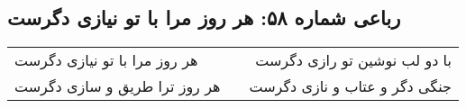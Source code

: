 \begin{center}
\section*{رباعی شماره ۵۸: هر روز مرا با تو نیازی دگرست}
\label{sec:sh058}
\begin{longtable}{l p{0.5cm} r}
هر روز مرا با تو نیازی دگرست
&&
با دو لب نوشین تو رازی دگرست
\\
هر روز ترا طریق و سازی دگرست
&&
جنگی دگر و عتاب و نازی دگرست
\\
\end{longtable}
\end{center}
